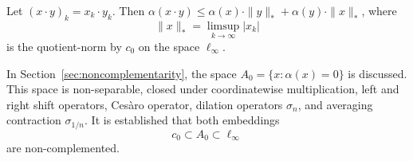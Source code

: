 	Let $(x\cdot y)_k = x_k\cdot y_k$.
	Then
	$\alpha(x\cdot y)\leq \alpha(x)\cdot \|y\|_* + \alpha(y)\cdot \|x\|_*$,
	where
	\begin{equation}
		\|x\|_* = \limsup_{k\to\infty} |x_k|
	\end{equation}
	is the quotient-norm by $c_0$ on the space $\ell_\infty$.

In Section~\ref{sec:noncomplementarity}, the space $A_0 = \{x: \alpha(x) = 0\}$ is discussed.
This space is non-separable, closed under coordinatewise multiplication,
left and right shift operators, Cesàro operator,
dilation operators $\sigma_n$, and averaging contraction $\sigma_{1/n}$.
It is established that both embeddings
\begin{equation}
	c_0 \subset A_0 \subset \ell_\infty
\end{equation}
are non-complemented.
